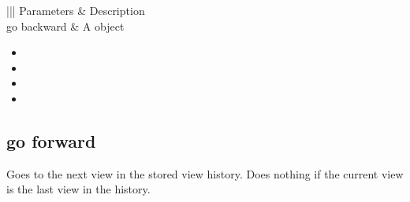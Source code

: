 \documentclass[letterpaper,12pt,english,openany,oneside]{sphinxmanual}
\begin{document}
\begin{savenotes}\sphinxattablestart
\centering
{}\label{\detokenize{IAC_API_AppleEvtObjects:section-38}}\nobreak
\begin{tabular}[t]{|||}
\hline
\sphinxstyletheadfamily 
Parameters
&\sphinxstyletheadfamily 
Description
\\
\hline
go backward
&
A  object
\\
\hline
\end{tabular}
\par
\sphinxattableend\end{savenotes}
\label{\detokenize{IAC_API_AppleEvtObjects:related-events-13}}
\begin{itemize}
\item {} 

\item {} 

\item {} 

\item {} 

\end{itemize}
\label{\detokenize{IAC_API_AppleEvtObjects:applescript-example-19}}

\begin{sphinxVerbatim}[commandchars=\\\{\}]
    
\end{sphinxVerbatim}
\label{\detokenize{IAC_API_AppleEvtObjects:apple-event-id-10}}

\begin{sphinxVerbatim}[commandchars=\\\{\}]
 
\end{sphinxVerbatim}




\subsection{go forward}
\label{\detokenize{IAC_API_AppleEvtObjects:go-forward}}
Goes to the next view in the stored view history. Does nothing if the current view is the last view in the history.
\end{document}
